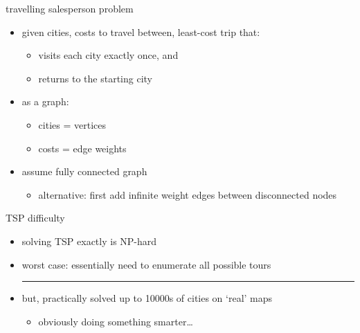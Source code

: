 \begin{frame}{travelling salesperson problem}
\begin{itemize}
\item given cities, costs to travel between, least-cost trip that:
\begin{itemize}
\item visits each city exactly once, and
\item returns to the starting city
\end{itemize}
\item as a graph:
\begin{itemize}
\item cities = vertices
\item costs = edge weights
\end{itemize}
\item assume fully connected graph
\begin{itemize}
\item alternative: first add infinite weight edges between disconnected nodes
\end{itemize}
\end{itemize}
\end{frame}

\begin{frame}{TSP difficulty}
\begin{itemize}
\item solving TSP exactly is NP-hard
\vspace{.5cm}
\item worst case: essentially need to enumerate all possible tours
\hrule
\item but, practically solved up to 10000s of cities on `real' maps
\begin{itemize}
\item obviously doing something smarter\ldots
\end{itemize}
\end{itemize}
\end{frame}
